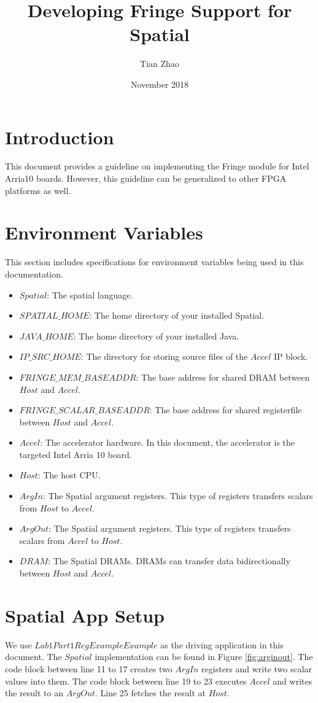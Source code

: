 \documentclass{article}
\title{Developing Fringe Support for Spatial}
\author{Tian Zhao}
\date{November 2018}
\begin{document}
\maketitle

\section{Introduction}
This document provides a guideline on implementing the Fringe module for Intel Arria10 boards.
However, this guideline can be generalized to other FPGA platforms as well.

\section{Environment Variables}
This section includes specifications for environment variables being used in this documentation.
\begin{itemize}
    \item $Spatial$: The spatial language.
    \item $SPATIAL\_HOME$: The home directory of your installed Spatial.
    \item $JAVA\_HOME$: The home directory of your installed Java.
    \item $IP\_SRC\_HOME$: The directory for storing source files of the $Accel$ IP block.
    \item $FRINGE\_MEM\_BASEADDR$: The base address for shared DRAM between $Host$ and $Accel$.
    \item $FRINGE\_SCALAR\_BASEADDR$: The base address for shared registerfile between $Host$ and $Accel$.
    \item $Accel$: The accelerator hardware. In this document, the accelerator is the targeted Intel Arria 10 board.
    \item $Host$: The host CPU.
    \item $ArgIn$: The Spatial argument registers. This type of registers transfers scalars from $Host$ to $Accel$.
    \item $ArgOut$: The Spatial argument registers. This type of registers transfers scalars from $Accel$ to $Host$.
    \item $DRAM$: The Spatial DRAMs. DRAMs can transfer data bidirectionally between $Host$ and $Accel$.
\end{itemize}

\section{Spatial App Setup}
We use $Lab1Part1RegExampleExample$ as the driving application in this document.
The $Spatial$ implementation can be found in Figure \ref{fig:arginout}.
The code block between line 11 to 17 creates two $ArgIn$ registers and write two scalar values into them.
The code block between line 19 to 23 executes $Accel$ and writes the result to an $ArgOut$.
Line 25 fetches the result at $Host$.
\end{document}
